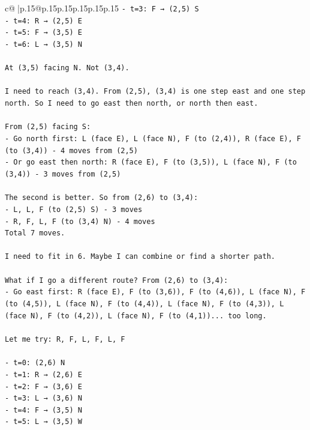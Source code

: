 \documentclass{article}
\begin{document}
{\begin{supertabular}{c@{$\;$}|p{.15\linewidth}@{}p{.15\linewidth}p{.15\linewidth}p{.15\linewidth}p{.15\linewidth}p{.15\linewidth}}
{{{\texttt{{-} t=3: F → (2,5) S} \\
\texttt{{-} t=4: R → (2,5) E} \\
\texttt{{-} t=5: F → (3,5) E} \\
\texttt{{-} t=6: L → (3,5) N} \\
\\ 
\texttt{At (3,5) facing N. Not (3,4).} \\
\\ 
\texttt{I need to reach (3,4). From (2,5), (3,4) is one step east and one step north. So I need to go east then north, or north then east.} \\
\\ 
\texttt{From (2,5) facing S:} \\
\texttt{{-} Go north first: L (face E), L (face N), F (to (2,4)), R (face E), F (to (3,4)) {-} 4 moves from (2,5)} \\
\texttt{{-} Or go east then north: R (face E), F (to (3,5)), L (face N), F (to (3,4)) {-} 3 moves from (2,5)} \\
\\ 
\texttt{The second is better. So from (2,6) to (3,4):} \\
\texttt{{-} L, L, F (to (2,5) S) {-} 3 moves} \\
\texttt{{-} R, F, L, F (to (3,4) N) {-} 4 moves} \\
\texttt{Total 7 moves.} \\
\\ 
\texttt{I need to fit in 6. Maybe I can combine or find a shorter path.} \\
\\ 
\texttt{What if I go a different route? From (2,6) to (3,4):} \\
\texttt{{-} Go east first: R (face E), F (to (3,6)), F (to (4,6)), L (face N), F (to (4,5)), L (face N), F (to (4,4)), L (face N), F (to (4,3)), L (face N), F (to (4,2)), L (face N), F (to (4,1))... too long.} \\
\\ 
\texttt{Let me try: R, F, L, F, L, F} \\
\\ 
\texttt{{-} t=0: (2,6) N} \\
\texttt{{-} t=1: R → (2,6) E} \\
\texttt{{-} t=2: F → (3,6) E} \\
\texttt{{-} t=3: L → (3,6) N} \\
\texttt{{-} t=4: F → (3,5) N} \\
\texttt{{-} t=5: L → (3,5) W} \\
}}}
\end{supertabular}}
\end{document}

